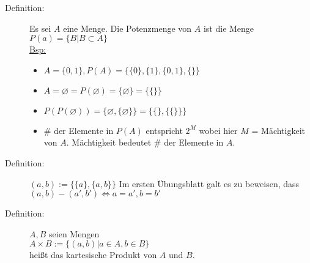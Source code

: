 \begin{minipage}{0.4\textwidth}
\end{minipage}%
\begin{minipage}{0.4\textwidth}
\end{minipage}%
\begin{description}
\item[Definition:] Es sei $A$ eine Menge. Die Potenzmenge von $A$ ist die Menge $P(a) = \{ B | B \subset A \}$\\
\underline{Bsp:} 
	\begin{itemize}
	\item $A = \{0,1\}, P(A) = \{\{0\},\{1\}, \{0,1\}, \{\} \}$
	\item $A = \varnothing = P(\varnothing) = \{\varnothing\} = \{\{\}\}$
	\item $P(P(\varnothing)) = \{\varnothing,\{\varnothing\}\} = \{\{\},\{\{\}\}\}$
	\item \# der Elemente in $P(A) $ entspricht $2^{M}$ wobei hier $M$ = Mächtigkeit von $A$. Mächtigkeit bedeutet \# der Elemente in $A$.
	\end{itemize} 
\item[Definition:] $(a,b):= \{\{a\},\{a,b\}\}$ Im ersten Übungsblatt galt es zu beweisen, dass\\ $(a,b) - (a',b') \Leftrightarrow a = a', b=b'$
\item[Definition:] $A,B$ seien Mengen\\
$A\times B := \{(a,b)|a\in A, b\in B\}$ \\
heißt das kartesische Produkt von $A$ und $B$.
\end{description}